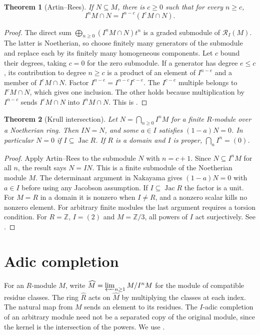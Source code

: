 \documentclass[11pt,oneside,openany]{book}
\newtheorem{theorem}{Theorem}[chapter]
\theoremstyle{definition}
\theoremstyle{remark}
\begin{document}
\begin{theorem}[Artin--Rees]\label{p103:ALG-05-C04-R02}
If \(N\subseteq M\), there is \(c\ge0\) such that for every \(n\ge c\),
\[
 I^nM\cap N=I^{n-c}(I^cM\cap N).
\]
\end{theorem}
\begin{proof}
The direct sum \(\bigoplus_{n\ge0}(I^nM\cap N)t^n\) is a graded submodule of \(\mathcal R_I(M)\). The latter is Noetherian, so choose finitely many generators of the submodule and replace each by its finitely many homogeneous components. Let \(c\) bound their degrees, taking \(c=0\) for the zero submodule. If a generator has degree \(e\le c\), its contribution to degree \(n\ge c\) is a product of an element of \(I^{n-e}\) and a member of \(I^eM\cap N\). Factor \(I^{n-e}=I^{n-c}I^{c-e}\). The \(I^{c-e}\) multiple belongs to \(I^cM\cap N\), which gives one inclusion. The other holds because multiplication by \(I^{n-c}\) sends \(I^cM\cap N\) into \(I^nM\cap N\). This is \cite[Lemma 5.1]{eisenbud}.
\end{proof}

\begin{theorem}[Krull intersection]\label{p103:ALG-05-C04-R04}
Let \(N=\bigcap_{n\ge0}I^nM\) for a finite \(R\)-module over a Noetherian ring. Then \(IN=N\), and some \(a\in I\) satisfies \((1-a)N=0\). In particular \(N=0\) if \(I\subseteq\operatorname{Jac}R\). If \(R\) is a domain and \(I\) is proper, \(\bigcap_n I^n=(0)\).
\end{theorem}
\begin{proof}
Apply Artin--Rees to the submodule \(N\) with \(n=c+1\). Since \(N\subseteq I^nM\) for all \(n\), the result says \(N=IN\). This is a finite submodule of the Noetherian module \(M\). The determinant argument in Nakayama gives \((1-a)N=0\) with \(a\in I\) before using any Jacobson assumption. If \(I\subseteq\operatorname{Jac}R\) the factor is a unit. For \(M=R\) in a domain it is nonzero when \(I\ne R\), and a nonzero scalar kills no nonzero element. For arbitrary finite modules the last argument requires a torsion condition. For \(R=\mathbb Z\), \(I=(2)\) and \(M=\mathbb Z/3\), all powers of \(I\) act surjectively. See \cite[Corollary 5.4]{eisenbud}.
\end{proof}

\section{Adic completion}

For an \(R\)-module \(M\), write \(\widehat M=\varprojlim_{n\ge1} M/I^nM\) for the module of compatible residue classes. The ring \(\widehat R\) acts on \(\widehat M\) by multiplying the classes at each index. The natural map from \(M\) sends an element to its residues. The \(I\)-adic completion of an arbitrary module need not be a separated copy of the original module, since the kernel is the intersection of the powers. We use \cite[Sections 7.1, 7.2 and 7.5]{eisenbud}.
\end{document}
